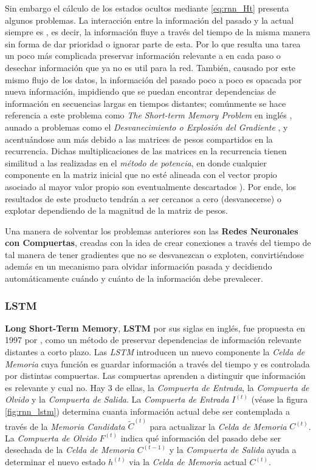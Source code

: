 Sin embargo el cálculo de los estados ocultos mediante \ref{eq:rnn_Ht} presenta algunos problemas.
La interacción entre la información del pasado y la actual siempre es , es decir, la información
fluye a través del tiempo de la misma manera sin forma de dar prioridad o ignorar parte de
esta. Por lo que resulta una tarea un poco más complicada preservar información relevante a en cada paso
o desechar información que ya no es util para la red. También, causado por este mismo flujo de los
datos, la información del pasado poco a poco es opacada por nueva información, impidiendo que se
puedan encontrar dependencias de información en secuencias largas en tiempos distantes;
comúnmente se hace referencia a este problema como \textit{The Short-term Memory Problem} en inglés
\cite{VanishinGradient2}, aunado a problemas como el
\textit{Desvanecimiento o Explosión del Gradiente} \cite{VanishinGradient} \cite{pmlr-v28-pascanu13},
y acentuándose aun más
debido a las matrices de pesos compartidos en la recurrencia. Dichas
multiplicaciones de las matrices en la recurrencia tienen similitud a las realizadas en el
\textit{método de potencia}, en donde cualquier
componente en la matriz inicial que no esté alineada con el vector propio asociado al mayor valor
propio son eventualmente descartados \cite[pp.~390-392]{GoodBengCour16}). Por ende, los resultados
de este producto tendrán a ser cercanos a cero (desvanecerse) o explotar dependiendo de la magnitud
de la matriz de pesos.

Una manera de solventar los problemas anteriores son las \textbf{Redes Neuronales con Compuertas},
creadas con la idea de crear conexiones a través del tiempo de tal manera de tener gradientes que no
se desvanezcan o exploten, convirtiéndose además en un mecanismo para olvidar información pasada y
decidiendo automáticamente cuándo y cuánto de la información debe prevalecer.

\subsubsection{LSTM}

\textbf{Long Short-Term Memory}, \textbf{LSTM} por sus siglas en inglés, fue propuesta en 1997 por
\citeauthor{LSTM}, como un método de preservar dependencias de información relevante
distantes a corto plazo. Las \textit{LSTM} introducen un nuevo componente la
\textit{Celda de Memoria} cuya función es guardar información a través del tiempo y es
controlada por distintas compuertas. Las compuertas aprenden a distinguir que información es relevante y
cual no. Hay 3 de ellas, la \textit{Compuerta de Entrada}, la \textit{Compuerta de Olvido}
y la \textit{Compuerta de Salida}. La \textit{Compuerta de Entrada} $I^{(t)}$ (véase la figura
\ref{fig:rnn_lstm}) determina cuanta información actual debe ser contemplada a través de la
\textit{Memoria Candidata} $\tilde C^{(t)}$ para actualizar la \textit{Celda de Memoria} $C^{(t)}$.
La \textit{Compuerta de Olvido} $F^{(t)}$ indica qué información del pasado debe ser desechada de la
\textit{Celda de Memoria} $C^{(t-1)}$ y la \textit{Compuerta de Salida} ayuda a determinar el nuevo
estado $h^{(t)}$ via la \textit{Celda de Memoria} actual $C^{(t)}$.

